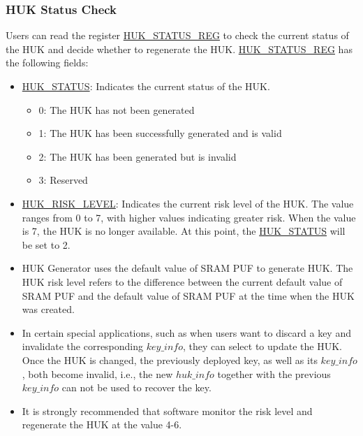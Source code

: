 \documentclass[main\_\_EN.tex]{subfiles}
\begin{document}
\subsubsection{HUK Status Check}
Users can read the register \hyperref[regdesc:HUKSTATUSREG]{HUK\_STATUS\_REG} to check the current status of the HUK and decide whether to regenerate the HUK. \hyperref[regdesc:HUKSTATUSREG]{HUK\_STATUS\_REG} has the following fields:
\begin{itemize}
    \item \hyperref[fielddesc:HUKSTATUS]{HUK\_STATUS}: Indicates the current status of the HUK.
    \begin{itemize}
        \item 0: The HUK has not been generated
        \item 1: The HUK has been successfully generated and is valid
        \item 2: The HUK has been generated but is invalid
        \item 3: Reserved
    \end{itemize}
    \item \hyperref[fielddesc:HUKRISKLEVEL]{HUK\_RISK\_LEVEL}: Indicates the current risk level of the HUK. The value ranges from 0 to 7, with higher values indicating greater risk. When the value is 7, the HUK is no longer available. At this point, the \hyperref[fielddesc:HUKSTATUS]{HUK\_STATUS} will be set to 2.
\end{itemize}

\vspace{-0.5em}
\begin{tiplisting}
\vspace{-2em}
\begin{itemize}
    \item HUK Generator uses the default value of SRAM PUF to generate HUK. The HUK risk level refers to the difference between the current default value of SRAM PUF and the default value of SRAM PUF at the time when the HUK was created.
    \item In certain special applications, such as when users want to discard a key and invalidate the corresponding \hyperref[para:keyinfo]{\begin{math}key\_info\end{math}}, they can select to update the HUK. Once the HUK is changed, the previously deployed key, as well as its \hyperref[para:keyinfo]{\begin{math}key\_info\end{math}}, both become invalid, i.e., the new \hyperref[para:hukinfo]{\begin{math}huk\_info\end{math}} together with the previous \hyperref[para:keyinfo]{\begin{math}key\_info\end{math}} can not be used to recover the key.
    \item It is strongly recommended that software monitor the risk level and regenerate the HUK at the value 4-6.
\end{itemize}
\end{tiplisting}
\end{document}
